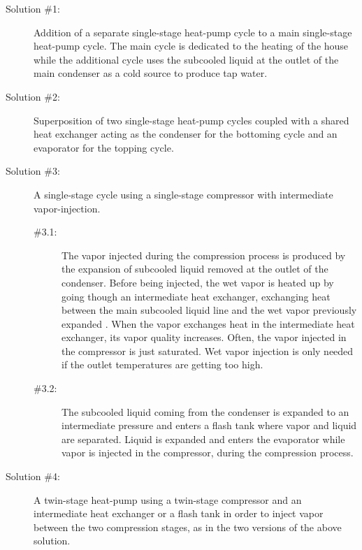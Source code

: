 \begin{description}
\item[Solution \#1:] Addition of a separate single-stage heat-pump
  cycle to a main single-stage heat-pump cycle. The main cycle is
  dedicated to the heating of the house while the additional cycle
  uses the subcooled liquid at the outlet of the main condenser as a
  cold source to produce tap water.
\item[Solution \#2:] Superposition of two single-stage heat-pump cycles
  coupled with a shared heat exchanger acting as the condenser for the
  bottoming cycle and an evaporator for the topping cycle.
\item[Solution \#3:] A single-stage cycle using a single-stage
  compressor with intermediate vapor-injection.
  \begin{description}
  \item[\#3.1:] The vapor injected during the compression process is
    produced by the expansion of subcooled liquid removed at the
    outlet of the condenser. Before being injected, the wet vapor is
    heated up by going though an intermediate heat exchanger,
    exchanging heat between the main subcooled liquid line and the wet
    vapor previously expanded
    \citep{Zehnder-Favrat-2002a,Beeton-Pham-2003a}. When the vapor
    exchanges heat in the intermediate heat exchanger, its vapor
    quality increases. Often, the vapor injected in the compressor is
    just saturated. Wet vapor injection is only needed if the outlet
    temperatures are getting too high.
  \item[\#3.2:] The subcooled liquid coming from the condenser is
    expanded to an intermediate pressure and enters a flash tank where
    vapor and liquid are separated. Liquid is expanded and enters the
    evaporator while vapor is injected in the compressor, during the
    compression process.
  \end{description}
\item[Solution \#4:] A twin-stage heat-pump using a twin-stage
  compressor and an intermediate heat exchanger or a flash tank in
  order to inject vapor between the two compression stages, as in the
  two versions of the above solution.
\end{description}

